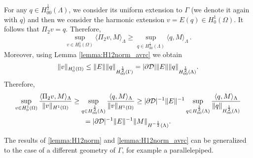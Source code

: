 \begin{itemize}
For any $q \in H^{\frac 12}_{00}(\Lambda)$, we consider its uniform extension to $\Gamma$ (we denote it again with $q$) 
and then we consider the harmonic extension $v=E(q)\in H^1_0(\Omega)$. It follows that $\Pi_2 v=q$. Therefore, 
\begin{equation*}
\sup _{v\in H^1_0(\Omega)}  \langle \Pi_2 v, M \rangle_\Lambda \geq \sup_{q \in H^{\frac 12}_{00}(\Lambda)} \langle q, M  \rangle_\Lambda\,.
\end{equation*}
Moreover, using Lemma \ref{lemma:H12norm_avrc} we obtain
\begin{equation*}
\|v\|_{H^1_0(\Omega)}\leq \|E\| \|q\|_{H^{\frac 12}_{00}(\Gamma)}  = | \partial {\cal D} | \|E\| \|q\|_{H^{\frac 12}_{00}(\Lambda)}.
\end{equation*}
 Therefore,
\begin{multline*}
\sup _{v\in H^1_0(\Omega)} \frac{ \langle \Pi_2 v, M \rangle_\Lambda}{\|v\|_{H^1(\Omega)}}
\geq \sup _{q\in H^{\frac 12}_{00}(\Lambda)} \frac{ \langle q, M \rangle_\Lambda}{\|v\|_{H^1(\Omega)}}
\geq |\partial {\cal D}|^{-1} \|E\|^{-1} \sup _{q\in H^{\frac 12}_{00}(\Lambda)} \frac{ \langle q, M \rangle_\Lambda}{\|q\|_{H^{\frac 12}_{00}(\Lambda)}} 
\\= |\partial {\cal D}|^{-1} \|E\|^{-1} \|M\|_{H^{-\frac 12}(\Lambda)}.
\end{multline*}

\end{itemize}

\begin{remark}
The results of \eqref{lemma:H12norm} and \eqref{lemma:H12norm_avrc} can be generalized to the case of a  different geometry of $\Gamma$, for example a parallelepiped.  
\end{remark}